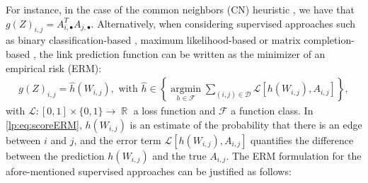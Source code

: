 \documentclass[a4paper, 11pt]{article}
\theoremstyle{remark}
\DeclareMathOperator{\argmin}{argmin}
\DeclareMathOperator{\R}{\mathbb{R}}
\DeclareMathOperator{\Dtr}{\cD_{\text{train}}}
\newcommand{\EM}{\ensuremath}
\newcommand{\cD}{\EM{\mathcal{D}}}
\newcommand{\cF}{\EM{\mathcal{F}}}
\newcommand{\cL}{\EM{\mathcal{L}}}
\begin{document}
For instance, in the case of the common neighbors (CN) heuristic \citep{lu2011link}, we have that $g(Z)_{i,j}= A_{i, \bullet}^T A_{j, \bullet}$. 
Alternatively, when considering supervised approaches such as binary classification-based \citep{zhang2018link, bleakley07}, maximum likelihood-based \citep{kipf2016variational, chiquet20} or matrix completion-based \citep{levina23, gaucher21}, the link prediction function can be written as the minimizer of an empirical risk (ERM): 
\begin{align} \label{lp:eq:scoreERM}
g(Z)_{i,j} = \hat h (W_{i,j}),  \text{ with } \hat h \in \left\{  \underset{h \in \cF}{\argmin} \sum_{(i,j) \in \cD %
} \cL[ h(W_{i,j}), %
A_{i,j} ] \right\}, %
\end{align}
with $\cL : [0,1] \times \{0,1\} \rightarrow \R$ a loss function and $\cF$ a function class. %
In \eqref{lp:eq:scoreERM}, $h(W_{i,j}) $ is an estimate of the probability that there is an edge between $i$ and $j$, and the error term $\cL[ h(W_{i,j}), A_{i,j} ]$ quantifies the difference between the prediction $h(W_{i,j})$ and the true $A_{i,j} $. 
The ERM formulation for the afore-mentioned supervised approaches can be justified as follows: 
\end{document}
